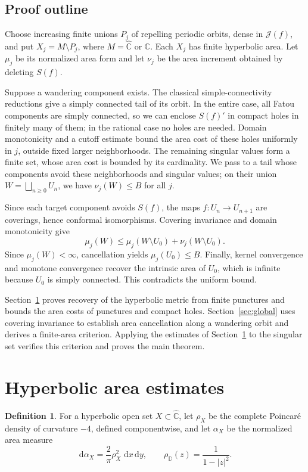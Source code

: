 \documentclass[11pt,reqno]{amsart}
\newcommand{\C}{\mathbb C}
\newcommand{\D}{\mathbb D}
\newcommand{\sphere}{\widehat{\mathbb C}}
\newcommand{\Jul}{\mathcal J}
\newcommand{\dd}{\,\mathrm d}
\theoremstyle{definition}
\newtheorem{definition}[theorem]{Definition}
\numberwithin{equation}{section}
\begin{document}
\subsection*{Proof outline}
Choose increasing finite unions $P_j$ of repelling periodic orbits,
dense in $\Jul(f)$, and put $X_j=M\setminus P_j$, where $M=\sphere$
or $\C$. Each $X_j$ has finite hyperbolic area. Let $\mu_j$ be its
normalized area form and let $\nu_j$ be the area increment obtained
by deleting $S(f)$.

Suppose a wandering component exists. The classical simple-connectivity
reductions give a simply connected tail of its orbit. In the entire
case, all Fatou components are simply connected, so we can enclose
$S(f)'$ in compact holes in finitely many of them; in the rational
case no holes are needed. Domain monotonicity and a cutoff estimate bound the
area cost of these holes uniformly in $j$, outside fixed larger
neighborhoods. The remaining singular values form a finite set, whose
area cost is bounded by its cardinality. We pass to a tail whose
components avoid these neighborhoods and singular values; on their union
$W=\bigsqcup_{n\ge0}U_n$, we have $\nu_j(W)\le B$ for all $j$.

Since each target component avoids $S(f)$, the maps
$f:U_n\to U_{n+1}$ are coverings, hence conformal isomorphisms.
Covering invariance and domain monotonicity give
\[
 \mu_j(W)\le\mu_j(W\setminus U_0)+\nu_j(W\setminus U_0).
\]
Since $\mu_j(W)<\infty$, cancellation yields $\mu_j(U_0)\le B$.
Finally, kernel convergence and monotone convergence recover the
intrinsic area of $U_0$, which is infinite because $U_0$ is simply
connected. This contradicts the uniform bound.

Section~\ref{sec:area} proves recovery of the hyperbolic metric from
finite punctures and bounds the area costs of punctures and compact
holes. Section~\ref{sec:global} uses covering invariance to establish
area cancellation along a wandering orbit and derives a finite-area
criterion. Applying the estimates of Section~\ref{sec:area} to the
singular set verifies this criterion and proves the main theorem.

\section{Hyperbolic area estimates}\label{sec:area}

\begin{definition}\label{def:area}
For a hyperbolic open set $X\subset\sphere$, let $\rho_X$ be the
complete Poincar\'e density of curvature $-4$, defined componentwise,
and let $\alpha_X$ be the normalized area measure
\[
 \dd\alpha_X=\frac2\pi\rho_X^2\,\dd x\dd y,
 \qquad \rho_\D(z)=\frac1{1-|z|^2}.
\]
\end{definition}
\end{document}
